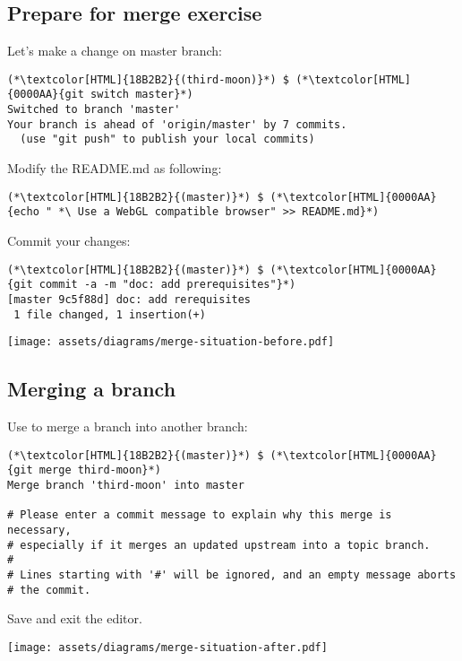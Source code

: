 \subsection{Prepare for merge exercise}
\begin{frame}[fragile]
  \subslidetitle

  Let's make a change on master branch:
  \begin{lstlisting}
(*\textcolor[HTML]{18B2B2}{(third-moon)}*) $ (*\textcolor[HTML]{0000AA}{git switch master}*)
Switched to branch 'master'
Your branch is ahead of 'origin/master' by 7 commits.
  (use "git push" to publish your local commits)
\end{lstlisting}

  Modify the README.md as following:
  \begin{lstlisting}
(*\textcolor[HTML]{18B2B2}{(master)}*) $ (*\textcolor[HTML]{0000AA}{echo " *\ Use a WebGL compatible browser" >> README.md}*)
\end{lstlisting}

  Commit your changes:
  \begin{lstlisting}
(*\textcolor[HTML]{18B2B2}{(master)}*) $ (*\textcolor[HTML]{0000AA}{git commit -a -m "doc: add prerequisites"}*)
[master 9c5f88d] doc: add rerequisites
 1 file changed, 1 insertion(+)
\end{lstlisting}

  \centerline{\texttt{[image: assets/diagrams/merge-situation-before.pdf]}}

\end{frame}

\subsection{Merging a branch}
\begin{frame}[fragile]
  \subslidetitle

  Use  to merge a branch into another branch:

  \begin{lstlisting}
(*\textcolor[HTML]{18B2B2}{(master)}*) $ (*\textcolor[HTML]{0000AA}{git merge third-moon}*)
Merge branch 'third-moon' into master

# Please enter a commit message to explain why this merge is necessary,
# especially if it merges an updated upstream into a topic branch.
#
# Lines starting with '#' will be ignored, and an empty message aborts
# the commit.
\end{lstlisting}

  Save and exit the editor.
  \centerline{\texttt{[image: assets/diagrams/merge-situation-after.pdf]}}

\end{frame}

